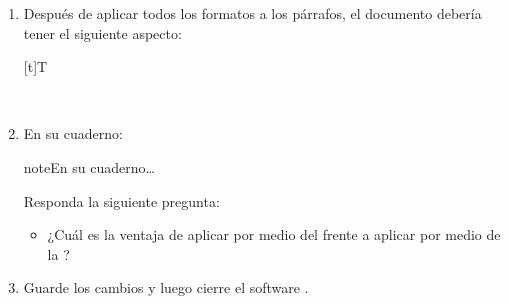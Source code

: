 \documentclass[letterpaper,10pt,spanish]{sphinxmanual}
\let\sphinxpxdimen\pdfpxdimen\else\newdimen\sphinxpxdimen
\begin{document}
\begin{enumerate}
\begin{sphinxadmonition}{note}{Advertencia}
\begin{itemize}
\end{itemize}

\begin{sphinxadmonition}{note}{En su cuaderno…}

\sphinxAtStartPar
En caso de que  (por ejemplo los colores), elegir la opción más cercana y en su cuaderno escribir las opciones que no coincidieron y cómo las reemplazó.
\end{sphinxadmonition}
\end{sphinxadmonition}

\item {} 
\sphinxAtStartPar
Después de aplicar todos los formatos a los párrafos, el documento debería tener el siguiente aspecto:


\begin{savenotes}\sphinxattablestart
\sphinxthistablewithglobalstyle
\centering
\begin{tabulary}{\linewidth}[t]{T}
\sphinxtoprule
\sphinxtableatstartofbodyhook

\begin{sphinxfigure-in-table}
\centering

\noindent\sphinxincludegraphics[width=500\sphinxpxdimen]{{image075}.png}
\end{sphinxfigure-in-table}\relax
\\
\sphinxbottomrule
\end{tabulary}
\sphinxtableafterendhook\par
\sphinxattableend\end{savenotes}

\item {} 
\sphinxAtStartPar
En su cuaderno:

\begin{sphinxadmonition}{note}{En su cuaderno…}

\sphinxAtStartPar
Responda la siguiente pregunta:
\begin{itemize}
\item {} 
\sphinxAtStartPar
¿Cuál es la ventaja de aplicar  por medio del  frente a aplicar  por medio de la ?

\end{itemize}
\end{sphinxadmonition}

\item {} 
\sphinxAtStartPar
Guarde los cambios y luego cierre el software .

\end{enumerate}
\end{document}
